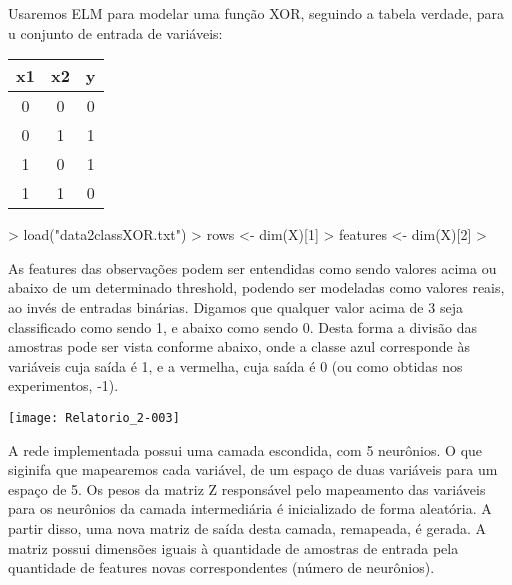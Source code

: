 \documentclass{article}
\begin{document}
Usaremos ELM para modelar uma função XOR, seguindo a tabela verdade,  para u conjunto de entrada de variáveis:

\begin{table}[H]
\begin{tabular}{ccc}
\textbf{x1} & \textbf{x2} & \textbf{y} \\ \hline
0 & 0 & 0 \\
0 & 1 & 1 \\
1 & 0 & 1 \\
1 & 1 & 0
\end{tabular}
\end{table}

\begin{Schunk}
\begin{Sinput}
> load("data2classXOR.txt")
> rows <- dim(X)[1]
> features <- dim(X)[2]
> 
\end{Sinput}
\end{Schunk}

As features das observações podem ser entendidas como sendo valores acima ou abaixo de um determinado threshold, podendo ser modeladas como valores reais, ao invés de entradas binárias. Digamos que qualquer valor acima de 3 seja classificado como sendo 1, e abaixo como sendo 0. Desta forma a divisão das amostras pode ser vista conforme abaixo, onde a classe azul corresponde às variáveis cuja saída é 1, e a vermelha, cuja saída é 0 (ou como obtidas nos experimentos, -1).

\texttt{[image: Relatorio\_2-003]}


A rede implementada possui uma camada escondida, com 5 neurônios. O que siginifa que mapearemos cada variável, de um espaço de duas variáveis para um espaço de 5. Os pesos da matriz Z responsável pelo mapeamento das variáveis para os neurônios da camada intermediária é inicializado de forma aleatória. A partir disso, uma nova matriz de saída desta camada, remapeada, é gerada. A matriz possui dimensões iguais à quantidade de amostras de entrada pela quantidade de features novas correspondentes (número de neurônios).
\end{document}
